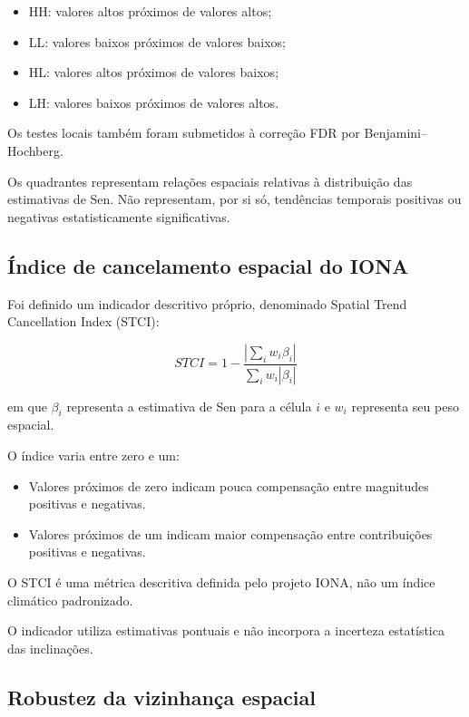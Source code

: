 \documentclass[12pt,a4paper]{article}
\begin{document}
\begin{itemize}
    \item HH: valores altos próximos de valores altos;
    \item LL: valores baixos próximos de valores baixos;
    \item HL: valores altos próximos de valores baixos;
    \item LH: valores baixos próximos de valores altos.
\end{itemize}

Os testes locais também foram submetidos à correção
FDR por Benjamini--Hochberg.

Os quadrantes representam relações espaciais
relativas à distribuição das estimativas de Sen.
Não representam, por si só, tendências temporais
positivas ou negativas estatisticamente significativas.

\subsection{Índice de cancelamento espacial do IONA}

Foi definido um indicador descritivo próprio,
denominado Spatial Trend Cancellation Index (STCI):

\begin{equation}
STCI =
1 -
\frac{
\left|\sum_i w_i \beta_i\right|
}{
\sum_i w_i |\beta_i|
}
\end{equation}

em que $\beta_i$ representa a estimativa de Sen
para a célula $i$ e $w_i$ representa seu peso espacial.

O índice varia entre zero e um:

\begin{itemize}
    \item Valores próximos de zero indicam pouca
    compensação entre magnitudes positivas e negativas.
    \item Valores próximos de um indicam maior
    compensação entre contribuições positivas e negativas.
\end{itemize}

O STCI é uma métrica descritiva definida pelo projeto
IONA, não um índice climático padronizado.

O indicador utiliza estimativas pontuais e não
incorpora a incerteza estatística das inclinações.

\subsection{Robustez da vizinhança espacial}
\end{document}
